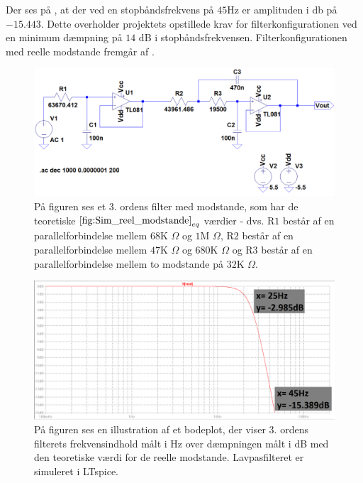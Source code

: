 Der ses på , at der ved en stopbåndsfrekvens på $45$Hz er amplituden i db på $-15.443$. Dette overholder projektets opstillede krav for filterkonfigurationen ved en minimum dæmpning på $14$ dB i stopbåndsfrekvensen. Filterkonfigurationen med reelle modstande fremgår af .
\begin{figure}[H]
	\centering
	\includegraphics[scale=0.4]{figures/cProblemloesning/Sim_reel_modstande.PNG}
	\caption{På figuren ses et 3. ordens filter med modstande, som har de teoretiske $\ref{fig:Sim_reel_modstande}_{eq}$ værdier - dvs. R$1$ består af en parallelforbindelse mellem $68$K $\Omega$ og $1$M $\Omega$, R$2$ består af en parallelforbindelse mellem $47$K $\Omega$ og $680$K $\Omega$ og R$3$ består af en parallelforbindelse mellem to modstande på $32$K $\Omega$.}
	\label{fig:Sim_reel_modstande}
\end{figure}

\begin{figure}[H]
	\centering
	\includegraphics[scale=0.35]{figures/cProblemloesning/Sim_reel_graf.PNG}
	\caption{På figuren ses en illustration af et bodeplot, der viser 3. ordens filterets frekvensindhold målt i Hz over dæmpningen målt i dB med den teoretiske værdi for de reelle modstande. Lavpasfilteret er simuleret i LTspice.}
	\label{fig:Sim_reel_graf}
\end{figure}

